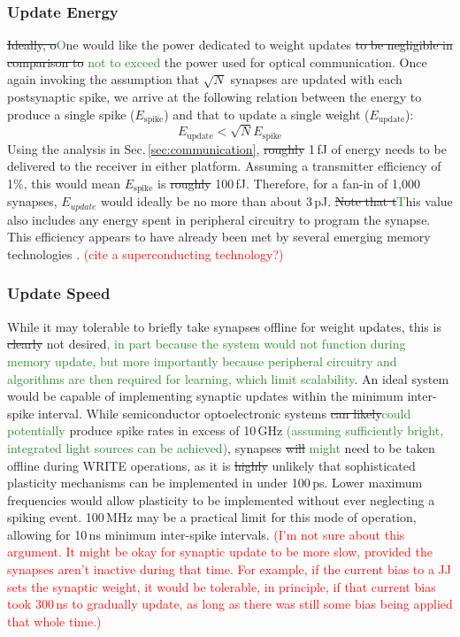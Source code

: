 \documentclass[twocolumn]{article}
\begin{document}
\subsubsection{Update Energy}
\sout{Ideally, o}\textcolor{ForestGreen}{O}ne would like the power dedicated to weight updates \sout{to be negligible in comparison to} \textcolor{ForestGreen}{not to exceed} the power used for optical communication. Once again invoking the assumption that $\sqrt{N}$ synapses are updated with each postsynaptic spike, we arrive at the following relation between the energy to produce a single spike ($E_{\mathrm{spike}}$) and that to update a single weight ($E_{\mathrm{update}}$):
\begin{equation}
    E_{\mathrm{update}} < \sqrt{N}E_{\mathrm{spike}}
\end{equation}
Using the analysis in Sec.\,\ref{sec:communication}, \sout{roughly} 1\,fJ of energy needs to be delivered to the receiver in either platform. Assuming a transmitter efficiency of 1\%, this would mean $E_{\mathrm{spike}}$ is \sout{roughly} 100\,fJ. Therefore, for a fan-in of 1,000 synapses, $E_{update}$ would ideally be no more than about 3\,pJ. \sout{Note that t}\textcolor{ForestGreen}{T}his value also includes any energy spent in peripheral circuitry to program the synapse. This efficiency appears to have already been met by several emerging memory technologies \cite{zahoor2020resistive}. \textcolor{red}{(cite a superconducting technology?)}

\subsubsection{Update Speed}
While it may tolerable to briefly take synapses offline for weight updates, this is \sout{clearly} not desired\textcolor{ForestGreen}{, in part because the system would not function during memory update, but more importantly because peripheral circuitry and algorithms are then required for learning, which limit scalability}. An ideal system would be capable of implementing synaptic updates within the minimum inter-spike interval. While semiconductor optoelectronic systems \sout{can likely}\textcolor{ForestGreen}{could potentially} produce spike rates in excess of 10\,GHz\textcolor{ForestGreen}{ (assuming sufficiently bright, integrated light sources can be achieved)}, synapses \sout{will} \textcolor{ForestGreen}{might} need to be taken offline during WRITE operations, as it is \sout{highly} unlikely that sophisticated plasticity mechanisms can be implemented in under 100\,ps. Lower maximum frequencies would allow plasticity to be implemented without ever neglecting a spiking event. 100\,MHz may be a practical limit for this mode of operation, allowing for 10\,ns minimum inter-spike intervals. \textcolor{red}{(I'm not sure about this argument. It might be okay for synaptic update to be more slow, provided the synapses aren't inactive during that time. For example, if the current bias to a JJ sets the synaptic weight, it would be tolerable, in principle, if that current bias took 300\,ns to gradually update, as long as there was still some bias being applied that whole time.)}
\end{document}
